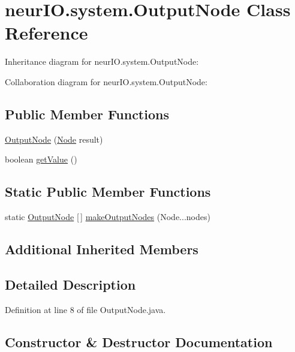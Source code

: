 \hypertarget{classneur_i_o_1_1system_1_1_output_node}{}\section{neur\+I\+O.\+system.\+Output\+Node Class Reference}
\label{classneur_i_o_1_1system_1_1_output_node}


Inheritance diagram for neur\+I\+O.\+system.\+Output\+Node\+:


Collaboration diagram for neur\+I\+O.\+system.\+Output\+Node\+:
\subsection*{Public Member Functions}
\begin{DoxyCompactItemize}
\item 
\hyperlink{classneur_i_o_1_1system_1_1_output_node_ac4e8788594edf3352bb2037b7e505816}{Output\+Node} (\hyperlink{classneur_i_o_1_1system_1_1_node}{Node} result)
\item 
boolean \hyperlink{classneur_i_o_1_1system_1_1_output_node_ae5d244e5bb2168f66acbca5854fc614c}{get\+Value} ()
\end{DoxyCompactItemize}
\subsection*{Static Public Member Functions}
\begin{DoxyCompactItemize}
\item 
static \hyperlink{classneur_i_o_1_1system_1_1_output_node}{Output\+Node} \mbox{[}$\,$\mbox{]} \hyperlink{classneur_i_o_1_1system_1_1_output_node_a7573728315335709ca81071b797f62b8}{make\+Output\+Nodes} (Node...\+nodes)
\end{DoxyCompactItemize}
\subsection*{Additional Inherited Members}


\subsection{Detailed Description}


Definition at line 8 of file Output\+Node.\+java.



\subsection{Constructor \& Destructor Documentation}
\mbox{\label{classneur_i_o_1_1system_1_1_output_node_ac4e8788594edf3352bb2037b7e505816}} 
